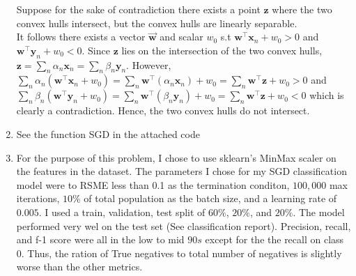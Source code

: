 \documentclass[10pt]{article}
\begin{document}
\begin{enumerate}
    Suppose for the sake of contradiction there exists a point $\mathbf{z}$ where the two convex hulls intersect, but the convex hulls are linearly separable.\\
    It follows there exists a vector $\vec{\mathbf{w}}$ and scalar $w_0$ s.t $\mathbf{w}^\top\mathbf{x}_n+w_0>0$ and $\mathbf{w}^\top\mathbf{y}_n+w_0<0$.
    Since $\mathbf{z}$ lies on the intersection of the two convex hulls, $\displaystyle\mathbf{z}=\sum_{n}\alpha_n\mathbf{x}_n=\sum_{n}\beta_n\mathbf{y}_n$.
    However, $\displaystyle\sum_{n}\alpha_n(\mathbf{w}^\top\mathbf{x}_n+w_0)=\sum_{n}\mathbf{w}^\top(\alpha_n\mathbf{x}_n)+w_0=\sum_{n}\mathbf{w}^\top\mathbf{z}+w_0>0$ and $\displaystyle\sum_{n}\beta_n(\mathbf{w}^\top\mathbf{y}_n+w_0)=\sum_{n}\mathbf{w}^\top(\beta_n\mathbf{y}_n)+w_0=\sum_{n}\mathbf{w}^\top\mathbf{z}+w_0<0$ which is clearly a contradiction.
    Hence, the two convex hulls do not intersect.
    \item See the function SGD in the attached code
    \item For the purpose of this problem, I chose to use sklearn's MinMax scaler on the features in the dataset. 
    The parameters I chose for my SGD classification model were to RSME less than 0.1 as the termination conditon, $100,000$ max iterations, $10\%$ of total population as the batch size, and a learning rate of $0.005$. 
    I used a train, validation, test split of $60\%$, $20\%$, and $20\%$.
    The model performed very wel on the test set (See classification report). Precision, recall, and f-1 score were all in the low to mid $90s$ except for the the recall on class $0$. Thus, the ration of True negatives to total number of negatives is slightly worse than the other metrics.
    
\end{enumerate}
\end{document}
